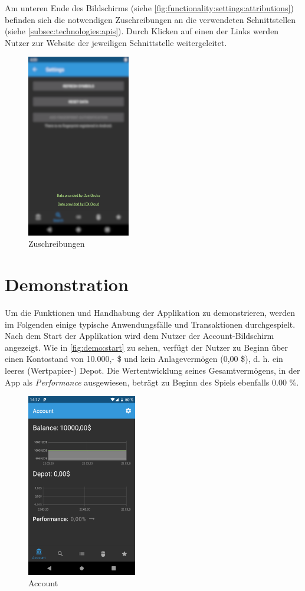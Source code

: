 \documentclass[a4paper]{article}
\begin{document}
Am unteren Ende des Bildschirms (siehe \autoref{fig:functionality:settings:attributions}) befinden sich die notwendigen Zuschreibungen an die verwendeten Schnittstellen (siehe \autoref{subsec:technologies:apis}).
Durch Klicken auf einen der Links werden Nutzer zur Website der jeweiligen Schnittstelle weitergeleitet.

\begin{figure}[H]
    \centering
    \includegraphics[width=.5\textwidth,height=8cm,keepaspectratio]{./images/settings/attribution.png}
    \caption{Zuschreibungen}
    \label{fig:functionality:settings:attributions}
\end{figure}

\section{Demonstration}
\label{sec:demo}
Um die Funktionen und Handhabung der Applikation zu demonstrieren, werden im Folgenden einige typische Anwendungsfälle und Transaktionen durchgespielt. Nach dem Start der Applikation wird dem Nutzer der Account-Bildschirm angezeigt. Wie in \autoref{fig:demo:start} zu sehen, verfügt der Nutzer zu Beginn über einen Kontostand von 10.000,- \$ und kein Anlagevermögen (0,00 \$), d. h. ein leeres (Wertpapier-) Depot. Die Wertentwicklung seines Gesamtvermögens, in der App als \textit{Performance} ausgewiesen, beträgt zu Beginn des Spiels ebenfalls 0.00 \%.

\begin{figure}[H]
	\centering
	\includegraphics[width=.5\textwidth,height=8cm,keepaspectratio]{./images/demo/start.png}
	\caption{Account}
	\label{fig:demo:start}
\end{figure}
\end{document}
